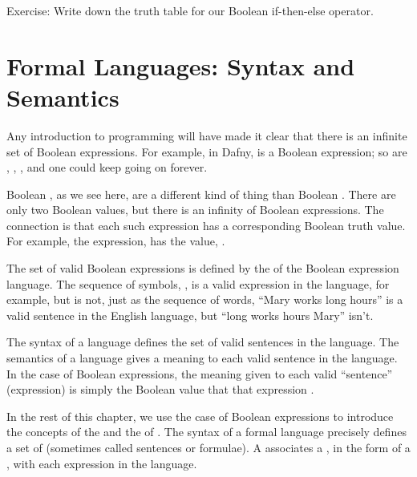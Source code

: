 \documentclass[letterpaper,10pt,english]{sphinxmanual}
\begin{document}
Exercise: Write down the truth table for our Boolean if-then-else
operator.


\section{Formal Languages: Syntax and Semantics}
\label{\detokenize{08-boolean-algebra:formal-languages-syntax-and-semantics}}
Any introduction to programming will have made it clear that there is
an infinite set of Boolean expressions. For example, in Dafny, 
is a Boolean expression; so are , , , and one could keep going on forever.

Boolean , as we see here, are a different kind of thing
than Boolean . There are only two Boolean values, but there is
an infinity of Boolean expressions. The connection is that each such
expression has a corresponding Boolean truth value. For example, the
expression,  has the value, .

The set of valid Boolean expressions is defined by the  of the
Boolean expression language. The sequence of symbols, , is a valid expression in the language, for example, but
 is not, just as the sequence of words,
“Mary works long hours” is a valid sentence in the English language,
but “long works hours Mary” isn’t.

The syntax of a language defines the set of valid sentences in the
language. The semantics of a language gives a meaning to each valid
sentence in the language. In the case of Boolean expressions, the
meaning given to each valid “sentence” (expression) is simply the
Boolean value that that expression .

In the rest of this chapter, we use the case of Boolean expressions to
introduce the concepts of the  and the  of . The syntax of a formal language precisely defines a set of
 (sometimes called sentences or formulae). A 
associates a , in the form of a , with each expression
in the language.
\end{document}
